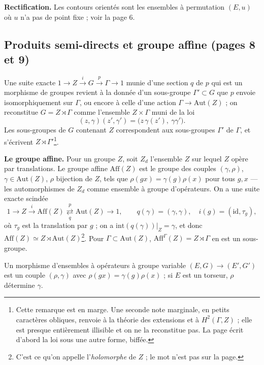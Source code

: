 \documentclass[11pt,a4paper]{article}
\begin{document}
\textbf{Rectification.} Les contours orientés sont les ensembles à
permutation $(E, u)$ où $u$ n'a pas de point fixe ; voir la page 6.

\subsection*{Produits semi-directs et groupe affine (pages 8 et 9)}

Une suite exacte $1 \to Z \xrightarrow{i} G \xrightarrow{p} \Gamma \to 1$
munie d'une section $q$ de $p$ qui est un morphisme de groupes revient à la
donnée d'un sous-groupe $\Gamma' \subset G$ que $p$ envoie isomorphiquement sur
$\Gamma$, ou encore à celle d'une action $\Gamma \to \mathrm{Aut}(Z)$ ; on
reconstitue $G = Z \rtimes \Gamma$ comme l'ensemble $Z \times \Gamma$ muni de
la loi
\[
  (z, \gamma)(z', \gamma') = \bigl(z\, \gamma(z'),\ \gamma\gamma'\bigr).
\]
Les sous-groupes de $G$ contenant $Z$ correspondent aux sous-groupes $\Gamma'$
de $\Gamma$, et s'écrivent $Z \rtimes \Gamma'$\footnote{Cette remarque est en
marge. Une seconde note marginale, en petits caractères obliques, renvoie à la
théorie des extensions et à $H^2(\Gamma, Z)$ ; elle est presque entièrement
illisible et on ne la reconstitue pas. La page écrit d'abord la loi sous une
autre forme, biffée.}.

\textbf{Le groupe affine.} Pour un groupe $Z$, soit $Z_d$ l'ensemble $Z$ sur
lequel $Z$ opère par translations. Le groupe affine $\mathrm{Aff}(Z)$ est le
groupe des couples $(\gamma, \rho)$, $\gamma \in \mathrm{Aut}(Z)$, $\rho$
bijection de $Z$, tels que $\rho(g x) = \gamma(g)\rho(x)$ pour tous $g, x$ ---
les automorphismes de $Z_d$ comme ensemble à groupe d'opérateurs. On a une
suite exacte scindée
\[
  1 \to Z \xrightarrow{i} \mathrm{Aff}(Z) \underset{q}{\overset{p}{\rightleftarrows}}
  \mathrm{Aut}(Z) \to 1, \qquad q(\gamma) = (\gamma, \gamma),\quad i(g) =
  (\mathrm{id}, \tau_g),
\]
où $\tau_g$ est la translation par $g$ ; on a
$\mathrm{int}(q(\gamma))|_Z = \gamma$, et donc $\mathrm{Aff}(Z) \simeq Z
\rtimes \mathrm{Aut}(Z)$\footnote{C'est ce qu'on appelle l'\emph{holomorphe}
de $Z$ ; le mot n'est pas sur la page.}. Pour $\Gamma \subset
\mathrm{Aut}(Z)$, $\mathrm{Aff}^{\Gamma}(Z) = Z \rtimes \Gamma$ en est un
sous-groupe.

Un morphisme d'ensembles à opérateurs à groupe variable $(E, G) \to (E', G')$
est un couple $(\rho, \gamma)$ avec $\rho(g x) = \gamma(g)\rho(x)$ ; si $E$ est
un torseur, $\rho$ détermine $\gamma$.
\end{document}
